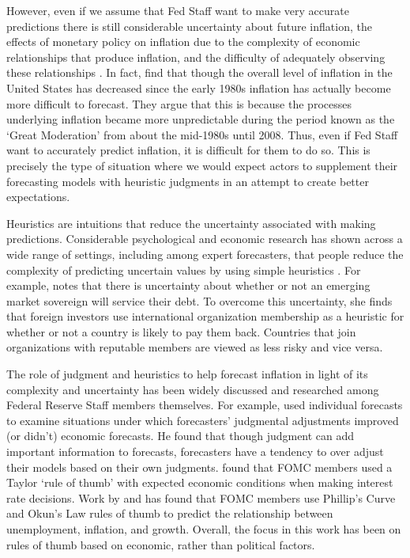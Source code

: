 \documentclass[a4paper]{article}\usepackage[]{graphicx}\usepackage[]{color}
\begin{document}
However, even if we assume that Fed Staff want to make very accurate predictions there is still considerable uncertainty about future inflation, the effects of monetary policy on inflation due to the complexity of economic relationships that produce inflation, and the difficulty of adequately observing these relationships \cite[see][22-24]{Schonhardt2013}. In fact, \cite{Gamber2009} find that though the overall level of inflation in the United States has decreased since the early 1980s inflation has actually become more difficult to forecast. They argue that this is because the processes underlying inflation became more unpredictable during the period known as the `Great Moderation' from about the mid-1980s until 2008. Thus, even if Fed Staff want to accurately predict inflation, it is difficult for them to do so. This is precisely the type of situation where we would expect actors to supplement their forecasting models with heuristic judgments in an attempt to create better expectations. 

Heuristics are intuitions that reduce the uncertainty associated with making predictions. Considerable psychological and economic research has shown across a wide range of settings, including among expert forecasters, that people reduce the complexity of predicting uncertain values by using simple heuristics \citep[see][]{kahneman1973,tverskykahneman1974,Tversky1983,Kahneman2002,kahneman2003}. For example, \cite{Gray2013} notes that there is uncertainty about whether or not an emerging market sovereign will service their debt. To overcome this uncertainty, she finds that foreign investors use international organization membership as a heuristic for whether or not a country is likely to pay them back. Countries that join organizations with reputable members are viewed as less risky and vice versa.

The role of judgment and heuristics to help forecast inflation in light of its complexity and uncertainty has been widely discussed and researched among Federal Reserve Staff members themselves. For example, \cite{McNees1990} used individual forecasts to examine situations under which forecasters' judgmental adjustments improved (or didn't) economic forecasts. He found that though judgment can add important information to forecasts, forecasters have a tendency to over adjust their models based on their own judgments. \cite{Orphanides2008} found that FOMC members used a Taylor `rule of thumb' with expected economic conditions when making interest rate decisions. Work by \cite{Tillmann2010Philips} and \cite{KnotekII2007} has found that FOMC members use Phillip's Curve and Okun's Law rules of thumb to predict the relationship between unemployment, inflation, and growth. Overall, the focus in this work has been on rules of thumb based on economic, rather than political factors.
\end{document}
